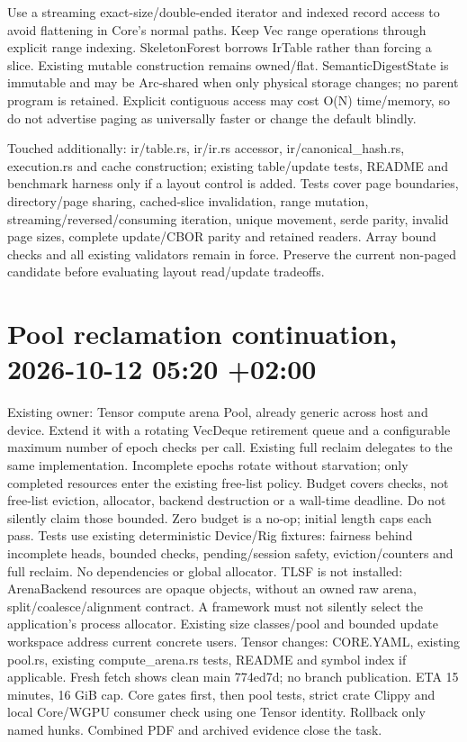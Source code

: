 \documentclass[11pt,a4paper]{article}
\begin{document}
Use a streaming exact-size/double-ended iterator and indexed record access to
avoid flattening in Core's normal paths. Keep Vec range operations through
explicit range indexing. SkeletonForest borrows IrTable rather than forcing a
slice. Existing mutable construction remains owned/flat. SemanticDigestState is
immutable and may be Arc-shared when only physical storage changes; no parent
program is retained. Explicit contiguous access may cost O(N) time/memory, so
do not advertise paging as universally faster or change the default blindly.

Touched additionally: ir/table.rs, ir/ir.rs accessor, ir/canonical\_hash.rs,
execution.rs and  cache construction; existing table/update
tests, README and benchmark harness only if a layout control is added.
Tests cover page boundaries, directory/page sharing, cached-slice invalidation,
range mutation, streaming/reversed/consuming iteration, unique movement, serde
parity, invalid page sizes, complete update/CBOR parity and retained readers.
Array bound checks and all existing validators remain in force. Preserve the
current non-paged candidate before evaluating layout read/update tradeoffs.


\section*{Pool reclamation continuation, 2026-10-12 05:20 +02:00}
Existing owner: Tensor compute arena Pool, already generic across host and device.
Extend it with a rotating VecDeque retirement queue and a configurable maximum
number of epoch checks per call. Existing full reclaim delegates to the same
implementation. Incomplete epochs rotate without starvation; only completed
resources enter the existing free-list policy. Budget covers checks, not free-list
eviction, allocator, backend destruction or a wall-time deadline. Do not silently
claim those bounded. Zero budget is a no-op; initial length caps each pass.
Tests use existing deterministic Device/Rig fixtures: fairness behind incomplete
heads, bounded checks, pending/session safety, eviction/counters and full reclaim.
No dependencies or global allocator. TLSF is not installed: ArenaBackend resources
are opaque objects, without an owned raw arena, split/coalesce/alignment contract.
A framework must not silently select the application's process allocator. Existing
size classes/pool and bounded update workspace address current concrete users.
Tensor changes: CORE.YAML, existing pool.rs, existing compute\_arena.rs tests,
README and symbol index if applicable. Fresh fetch shows clean main 774ed7d;
no branch publication. ETA 15 minutes, 16 GiB cap. Core gates first, then pool tests,
strict crate Clippy and local Core/WGPU consumer check using one Tensor identity.
Rollback only named hunks. Combined PDF and archived evidence close the task.
\end{document}
